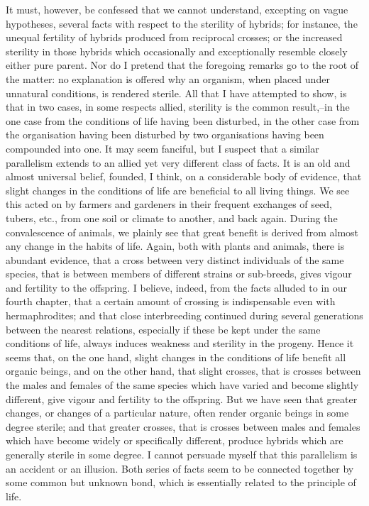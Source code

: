 It must, however, be confessed that we cannot understand, excepting on vague hypotheses, several facts with respect to the sterility of hybrids; for instance, the unequal fertility of hybrids produced from reciprocal crosses; or the increased sterility in those hybrids which occasionally and exceptionally resemble closely either pure parent. Nor do I pretend that the foregoing remarks go to the root of the matter: no explanation is offered why an organism, when placed under unnatural conditions, is rendered sterile. All that I have attempted to show, is that in two cases, in some respects allied, sterility is the common result,--in the one case from the conditions of life having been disturbed, in the other case from the organisation having been disturbed by two organisations having been compounded into one.
It may seem fanciful, but I suspect that a similar parallelism extends to an allied yet very different class of facts. It is an old and almost universal belief, founded, I think, on a considerable body of evidence, that slight changes in the conditions of life are beneficial to all living things. We see this acted on by farmers and gardeners in their frequent exchanges of seed, tubers, etc., from one soil or climate to another, and back again. During the convalescence of animals, we plainly see that great benefit is derived from almost any change in the habits of life. Again, both with plants and animals, there is abundant evidence, that a cross between very distinct individuals of the same species, that is between members of different strains or sub-breeds, gives vigour and fertility to the offspring. I believe, indeed, from the facts alluded to in our fourth chapter, that a certain amount of crossing is indispensable even with hermaphrodites; and that close interbreeding continued during several generations between the nearest relations, especially if these be kept under the same conditions of life, always induces weakness and sterility in the progeny.
Hence it seems that, on the one hand, slight changes in the conditions of life benefit all organic beings, and on the other hand, that slight crosses, that is crosses between the males and females of the same species which have varied and become slightly different, give vigour and fertility to the offspring. But we have seen that greater changes, or changes of a particular nature, often render organic beings in some degree sterile; and that greater crosses, that is crosses between males and females which have become widely or specifically different, produce hybrids which are generally sterile in some degree. I cannot persuade myself that this parallelism is an accident or an illusion. Both series of facts seem to be connected together by some common but unknown bond, which is essentially related to the principle of life.

